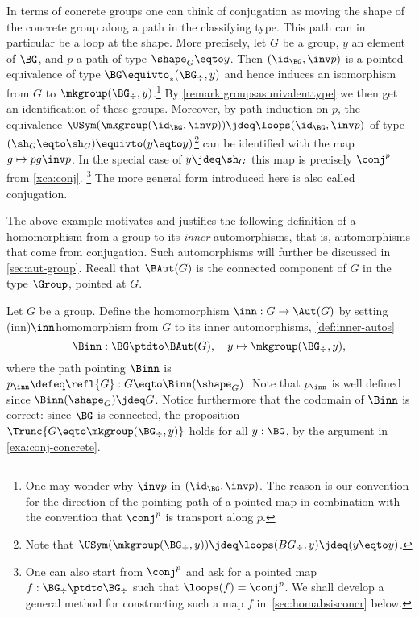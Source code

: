 \begin{example}
\label{exa:conj-concrete}
 In terms of concrete groups one can think of conjugation as moving
 the shape of the concrete group along a path in the classifying type. 
 This path can in particular be a loop at the shape. More precisely,
 let $G$ be a group, $y$ an element of $\BG$, and $p$ a path of 
 type $\shape_G\eqto y$.
 Then $(\id_\BG,\inv p)$ is a pointed equivalence of type 
 $\BG \equivto_* (\BG_\div , y)$ and hence induces an isomorphism 
 from $G$ to $\mkgroup(\BG_\div , y)$.\footnote{%
 One may wonder why $\inv p$ in $(\id_\BG,\inv p)$.
 The reason is our convention for the direction of the
 pointing path of a pointed map in combination with the
 convention that $\conj^p$ is transport along $p$.}
 By \cref{remark:groupsasunivalenttype} we then get an 
 identification of these groups.
 Moreover, by path induction on $p$, the equivalence
 $\USym(\mkgroup(\id_\BG,\inv p))\jdeq\loops(\id_\BG,\inv p)$ 
 of type $(\sh_G\eqto\sh_G)\equivto(y\eqto y)$\footnote{%
 Note that $\USym(\mkgroup(\BG_\div,y)) \jdeq 
 \loops(BG_\div,y) \jdeq (y\eqto y)$.}
 can be identified with the map $g \mapsto p g \inv p$. 
 In the special case
 of $y\jdeq\sh_G$ this map is precisely $\conj^p$ from \cref{xca:conj}.
 \footnote{%
 One can also start from $\conj^p$ and ask for a pointed map 
 $f: \BG_\div \ptdto \BG_\div$ such that $\loops(f) = \conj^p$.
 We shall develop a general method for constructing
 such a map $f$  in~\cref{sec:homabsisconcr} below.}
 The more general form introduced here is also called conjugation.
\end{example}

The above example motivates and justifies the following definition of
a homomorphism from a group to its \emph{inner} automorphisms, that is, 
automorphisms that come from conjugation.
Such automorphisms will further be discussed in \cref{sec:aut-group}.
Recall that $\BAut(G)$ is the connected component of $G$ in the type 
$\Group$, pointed at $G$.
 
\begin{definition}\label{def:inner-autos}
Let $G$ be a group. Define the homomorphism $\inn: G \to \Aut(G)$ by setting
\glossary(inn){$\protect\inn$}{homomorphism from $G$ to its inner automorphisms,
\cref{def:inner-autos}}
\begin{displaymath}
  \Binn : \BG \ptdto \BAut(G), \quad y \mapsto \mkgroup(\BG_\div , y),
\end{displaymath}
where the path pointing $\Binn$ is $p_{\inn} \defeq \refl{G} :  G \eqto \Binn (\shape_G)$.
Note that $p_{\inn}$ is well defined since $\Binn (\shape_G) \jdeq G$.
Notice furthermore that the codomain of $\Binn$ is correct: since $\BG$ is connected, 
the proposition $\Trunc{G \eqto \mkgroup(\BG_\div , y)}$ holds for all $y:\BG$, 
by the argument in \cref{exa:conj-concrete}.
\end{definition}

